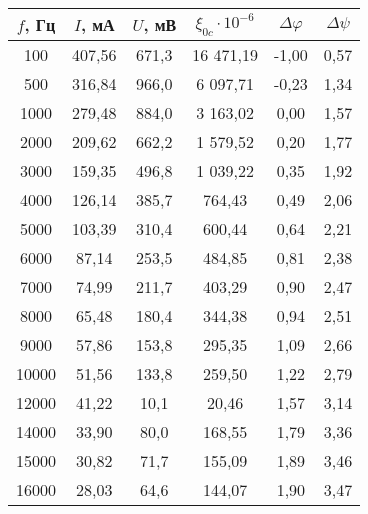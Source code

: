 \begin{table}[]
    \centering
    \begin{tabular}{|c|c|c|c|c|c|}
    \hline
    $f$, Гц & $I$, мА  & $U$, мВ   & $\xi_{0c} \cdot 10^{-6}$  & $\Delta \varphi$ & $\Delta \psi$ \\ \hline
    100     & 407,56   & 671,3     & 16 471,19                 & -1,00            & 0,57          \\ \hline
    500     & 316,84   & 966,0     & 6 097,71                  & -0,23            & 1,34          \\ \hline
    1000    & 279,48   & 884,0     & 3 163,02                  & 0,00             & 1,57          \\ \hline
    2000    & 209,62   & 662,2     & 1 579,52                  & 0,20             & 1,77          \\ \hline
    3000    & 159,35   & 496,8     & 1 039,22                  & 0,35             & 1,92          \\ \hline
    4000    & 126,14   & 385,7     & 764,43                    & 0,49             & 2,06          \\ \hline
    5000    & 103,39   & 310,4     & 600,44                    & 0,64             & 2,21          \\ \hline
    6000    & 87,14    & 253,5     & 484,85                    & 0,81             & 2,38          \\ \hline
    7000    & 74,99    & 211,7     & 403,29                    & 0,90             & 2,47          \\ \hline
    8000    & 65,48    & 180,4     & 344,38                    & 0,94             & 2,51          \\ \hline
    9000    & 57,86    & 153,8     & 295,35                    & 1,09             & 2,66          \\ \hline
    10000   & 51,56    & 133,8     & 259,50                    & 1,22             & 2,79          \\ \hline
    12000   & 41,22    & 10,1      & 20,46                     & 1,57             & 3,14          \\ \hline
    14000   & 33,90    & 80,0      & 168,55                    & 1,79             & 3,36          \\ \hline
    15000   & 30,82    & 71,7      & 155,09                    & 1,89             & 3,46          \\ \hline
    16000   & 28,03    & 64,6      & 144,07                    & 1,90             & 3,47          \\ \hline

\end{tabular}
\end{table}
